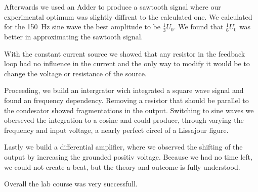 \documentclass[a4paper,10pt]{article}
\numberwithin{equation}{section}
\begin{document}
\begin{multicols}{2}
	Afterwards we used an Adder to produce a sawtooth signal where our experimental optimum was slightly diffrent to the calculated one. We calculated for the \SI{150}{Hz} sine wave the best amplitude to be $\frac{1}{3}U_0$. We found that $\frac{1}{6}U_0$ was better in approximating the sawtooth signal.

	With the constant current source we showed that any resistor in the feedback loop had no influence in the current and the only way to modify it would be to change the voltage or resistance of the source.

	Proceeding, we build an intergrator wich integrated a square wave signal and found an frequency dependency. Removing a resistor that should be parallel to the condesator showed fragmentations in the output. Switching to sine waves we oberseved the integration to a cosine and could produce, through varying the frequency and input voltage, a nearly perfect circel of a Lissajour figure.

	Lastly we build a differential amplifier, where we observed the shifting of the output by increasing the grounded positiv voltage. Because we had no time left, we could not create a beat, but the theory and outcome is fully understood.

	Overall the lab course was very successfull.

\end{multicols}


\clearpage
\listoffigures
\listoftables



\end{document}
